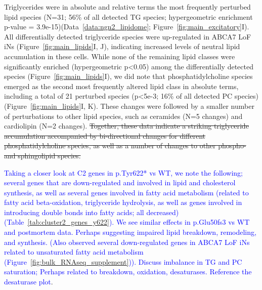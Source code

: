 Triglycerides were in absolute and relative terms the most frequently perturbed lipid species (N=31; 56\% of all detected TG species; hypergeometric enrichment p-value = 3.9e-15)(Data~\ref{data:ngn2_lipidome}; Figure~\ref{fig:main_excitatory}I). All differentially detected triglyceride species were up-regulated in ABCA7 LoF iNs (Figure~\ref{fig:main_lipids}I, J), indicating increased levels of neutral lipid accumulation in these cells. While none of the remaining lipid classes were significantly enriched (hypergeometric p<0.05) among the differentially detected species (Figure~\ref{fig:main_lipids}I), we did note that phosphatidylcholine species emerged as the second most frequently altered lipid class in absolute terms, including a total of 21 perturbed species (p<5e-3; 16\% of all detected PC species)(Figure~\ref{fig:main_lipids}I, K). These changes were followed by a smaller number of perturbations to other lipid species, such as ceramides (N=5 changes) and cardiolipin (N=2 changes). \sout{Together, these data indicate a striking triglyceride accumulation accompanied by bi-directional changes for different phosphatidylcholine species, as well as a number of changes to other phospho- and sphingolipid species.}

\textcolor{blue}{Taking a closer look at C2 genes in p.Tyr622* vs WT, we note the following; several genes that are down-regulated and involved in lipid and cholesterol synthesis, as well as several genes involved in fatty acid metabolism (related to fatty acid beta-oxidation, triglyceride hydrolysis, as well as genes involved in introducing double bonds into fatty acids; all decreased) (Table~\ref{tab:cluster2_genes_y622}). We see similar effects in p.Glu50fs3 vs WT and postmortem data. Perhaps suggesting impaired lipid breakdown, remodeling, and synthesis. (Also observed several down-regulated genes in ABCA7 LoF iNs related to unsaturated fatty acid metabolism (Figure~\ref{fig:bulk_RNAseq_supplement})). Discuss imbalance in TG and PC saturation; Perhaps related to breakdown, oxidation, desaturases. Reference the desaturase plot}.

